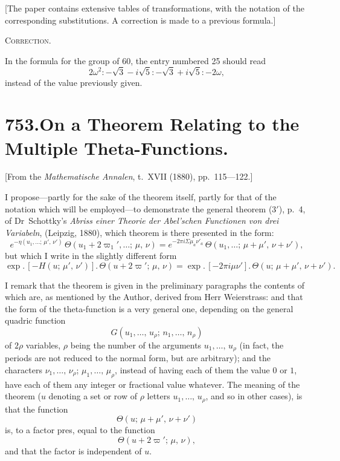 \documentclass[11pt,a4paper]{book}
\begin{document}
[The paper contains extensive tables of transformations, with the notation of the corresponding substitutions. A correction is made to a previous formula.]

\medskip

\textsc{Correction.}

In the formula for the group of 60, the entry numbered 25 should read
\[
2\omega^2 : -\sqrt{3} - i\sqrt{5} : -\sqrt{3} + i\sqrt{5} : -2\omega,
\]
instead of the value previously given.


\newpage
\section*{\textbf{753.}\quad On a Theorem Relating to the Multiple Theta-Functions.}

[From the \textit{Mathematische Annalen}, t.~XVII (1880), pp.~115---122.]

\medskip

I propose---partly for the sake of the theorem itself, partly for that of the notation which will be employed---to demonstrate the general theorem (3$'$), p.~4, of Dr~Schottky's \textit{Abriss einer Theorie der Abel'schen Functionen von drei Variabeln}, (Leipzig, 1880), which theorem is there presented in the form:
\[
e^{-\eta(u_1,\ldots;\, \mu',\, \nu')}\, \Theta(u_1 + 2\varpi_1',\ldots;\, \mu,\, \nu) = e^{-2\pi i \Sigma \mu_a \nu'_a}\, \Theta(u_1,\ldots;\, \mu + \mu',\, \nu + \nu'), \tag{3$'$}
\]
but which I write in the slightly different form
\[
\exp.\,[-H(u;\, \mu',\, \nu')].\, \Theta(u + 2\varpi';\, \mu,\, \nu) = \exp.\,[-2\pi i \mu\nu'].\, \Theta(u;\, \mu + \mu',\, \nu + \nu').
\]

I remark that the theorem is given in the preliminary paragraphs the contents of which are, as mentioned by the Author, derived from Herr Weierstrass: and that the form of the theta-function is a very general one, depending on the general quadric function
\[
G(u_1,\ldots,\, u_\rho;\, n_1,\ldots,\, n_\rho)
\]
of $2\rho$ variables, $\rho$ being the number of the arguments $u_1,\ldots,\, u_\rho$ (in fact, the periods are not reduced to the normal form, but are arbitrary); and the characters $\nu_1,\ldots,\, \nu_\rho$; $\mu_1,\ldots,\, \mu_\rho$, instead of having each of them the value $0$ or $1$, have each of them any integer or fractional value whatever. The meaning of the theorem ($u$ denoting a set or row of $\rho$ letters $u_1,\ldots,\, u_\rho$, and so in other cases), is that the function
\[
\Theta(u;\, \mu + \mu',\, \nu + \nu')
\]
is, to a factor pres, equal to the function
\[
\Theta(u + 2\varpi';\, \mu,\, \nu),
\]
and that the factor is independent of $u$.
\end{document}
